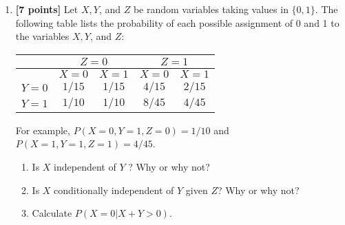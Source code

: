 \begin{enumerate}
\begin{enumerate}
	\item {\bf [7 points]}   Let $X, Y$, and $Z$ be random variables taking values in $\{0, 1\}$. The following table lists the probability of each possible assignment of 0 and 1 to the variables $X, Y$, and $Z$:
	\begin{table}[h]
		\centering
		\begin{tabular}{|c|c|c|c|c|}
			\hline 
			& \multicolumn{2}{|c|}{$Z = 0$} & \multicolumn{2}{|c|}{ $Z = 1$}  \\ 
			\hline 
			& $X = 0$ & $X = 1$ & $X = 0$ & $X = 1$ \\ 
			\hline 
			$Y = 0$ & $1/15$ &   $1/15$ &  $4/15$ &  $2/15$  \\ 
			$Y = 1$ & $1/10$ &   $1/10$ &  $8/45$ &  $4/45$  \\ 
			\hline 
		\end{tabular}
	\end{table}
	For example, $P(X = 0, Y = 1, Z = 0) = 1/10$ and $P(X = 1, Y = 1, Z = 1) = 4/45$.
	\begin{enumerate}
		\item  Is $X$ independent of $Y$ ? Why or why not?
		\item  Is $X$ conditionally independent of $Y$ given $Z$? Why or why not?
		\item  Calculate $P(X = 0|X + Y > 0)$.
	\end{enumerate}

\end{enumerate}



\end{enumerate}


